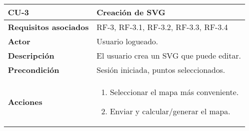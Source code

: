 \begin{longtable}[H]{@{}l|l@{}}
	\toprule
	\begin{minipage}[b]{0.23\columnwidth}\raggedright\strut
		\textbf{CU-3}\strut
	\end{minipage} & \begin{minipage}[b]{0.71\columnwidth}\raggedright\strut
		\textbf{Creación de SVG}\strut
	\end{minipage}\tabularnewline
	\toprule
	\endhead
	\begin{minipage}[t]{0.23\columnwidth}\raggedright\strut
		\textbf{Requisitos asociados}\strut
	\end{minipage} & \begin{minipage}[t]{0.71\columnwidth}\raggedright\strut
		RF-3, RF-3.1, RF-3.2, RF-3.3, RF-3.4\strut
	\end{minipage}\tabularnewline
	\midrule
	\begin{minipage}[t]{0.23\columnwidth}\raggedright\strut
		\textbf{Actor}\strut
	\end{minipage} & \begin{minipage}[t]{0.71\columnwidth}\raggedright\strut
		Usuario logueado.\strut
	\end{minipage}\tabularnewline
	\midrule
	\begin{minipage}[t]{0.23\columnwidth}\raggedright\strut
		\textbf{Descripción}\strut
	\end{minipage} & \begin{minipage}[t]{0.71\columnwidth}\raggedright\strut
		El usuario crea un SVG que puede editar.\strut
	\end{minipage}\tabularnewline
	\midrule
	\begin{minipage}[t]{0.23\columnwidth}\raggedright\strut
		\textbf{Precondición}\strut
	\end{minipage} & \begin{minipage}[t]{0.71\columnwidth}\raggedright\strut
		Sesión iniciada, puntos seleccionados.\strut
	\end{minipage}\tabularnewline
	\midrule
	\begin{minipage}[t]{0.23\columnwidth}\raggedright\strut
		\textbf{Acciones}\strut
	\end{minipage} & \begin{minipage}[t]{0.71\columnwidth}\raggedright
		\begin{enumerate}
			\def\labelenumi{\arabic{enumi}.}
			\tightlist
			\item Seleccionar el mapa más conveniente.
			\item Enviar y calcular/generar el mapa.

\end{enumerate}
\end{minipage}
\end{longtable}

